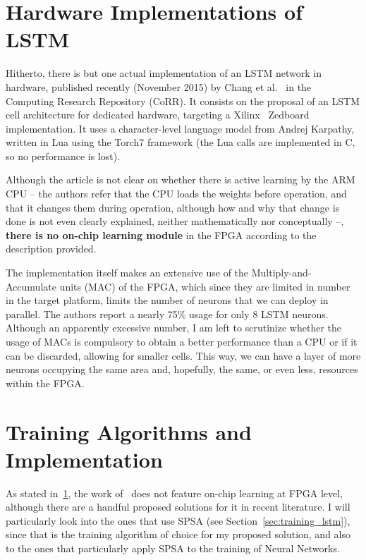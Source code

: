 \section{Hardware Implementations of LSTM}\label{sec:sa_hardware}
Hitherto, there is but one actual implementation of an LSTM network in hardware, published recently (November 2015) by Chang et al.~\cite{Chang15} in the Computing Research Repository (CoRR). It consists on the proposal of an LSTM cell architecture for dedicated hardware, targeting a Xilinx\textregistered~ Zedboard implementation. It uses a character-level language model from Andrej Karpathy, written in Lua using the Torch7 framework (the Lua calls are implemented in C, so no performance is lost).

Although the article is not clear on whether there is active learning by the ARM CPU -- the authors refer that the CPU loads the weights before operation, and that it changes them during operation, although how and why that change is done is not even clearly explained, neither mathematically nor conceptually --, \textbf{there is no on-chip learning module} in the FPGA according to the description provided. 

The implementation itself makes an extensive use of the Multiply-and-Accumulate units (MAC) of the FPGA, which since they are limited in number in the target platform, limits the number of neurons that we can deploy in parallel. The authors report a nearly 75\% usage for only 8 LSTM neurons. Although an apparently excessive number, I am left to scrutinize whether the usage of MACs is compulsory to obtain a better performance than a CPU or if it can be discarded, allowing for smaller cells. This way, we can have a layer of more neurons occupying the same area and, hopefully, the same, or even less, resources within the FPGA.

\section{Training Algorithms and Implementation}\label{sec:sa_training}
As stated in~\ref{sec:sa_hardware}, the work of~\cite{Chang15} does not feature on-chip learning at FPGA level, although there are a handful proposed solutions for it in recent literature. I will particularly look into the ones that use SPSA (see Section~\ref{sec:training_lstm}), since that is the training algorithm of choice for my proposed solution, and also to the ones that particularly apply SPSA to the training of Neural Networks. 

